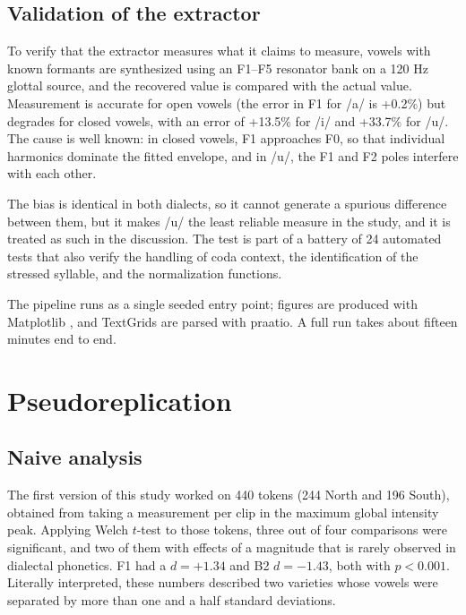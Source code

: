 \documentclass[11pt]{article}
\begin{document}
\subsection{Validation of the extractor}

To verify that the extractor measures what it claims to measure, vowels with
known formants are synthesized using an F1--F5 resonator bank on a 120 Hz glottal
source, and the recovered value is compared with the actual value. Measurement is
accurate for open vowels (the error in F1 for /a/ is +0.2\%) but degrades for
closed vowels, with an error of +13.5\% for /i/ and +33.7\% for /u/. The cause is
well known: in closed vowels, F1 approaches F0, so that individual harmonics
dominate the fitted envelope, and in /u/, the F1 and F2 poles interfere with each
other.

The bias is identical in both dialects, so it cannot generate a spurious
difference between them, but it makes /u/ the least reliable measure in the
study, and it is treated as such in the discussion. The test is part of a battery
of 24 automated tests that also verify the handling of coda context, the
identification of the stressed syllable, and the normalization functions.

The pipeline runs as a single seeded entry point; figures are produced with
Matplotlib \citep{hunter2007}, and TextGrids are parsed with praatio. A full run
takes about fifteen minutes end to end.

\section{Pseudoreplication}
\label{sec:pseudo}

\subsection{Naive analysis}

The first version of this study worked on 440 tokens (244 North and 196 South),
obtained from taking a measurement per clip in the maximum global intensity peak.
Applying Welch $t$-test to those tokens, three out of four comparisons were
significant, and two of them with effects of a magnitude that is rarely observed
in dialectal phonetics. F1 had a $d = +1.34$ and B2 $d = -1.43$, both with
$p < 0.001$. Literally interpreted, these numbers described two varieties whose
vowels were separated by more than one and a half standard deviations.
\end{document}
